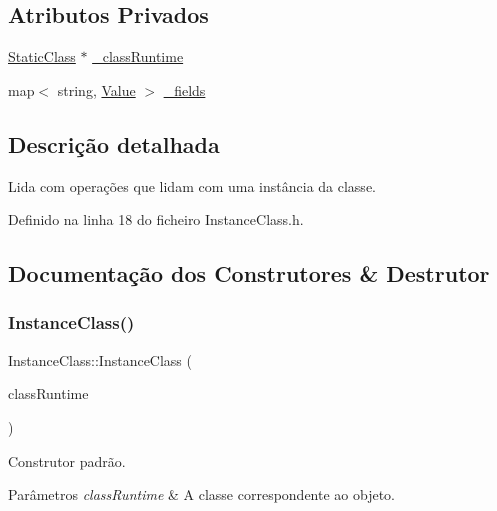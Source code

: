 \subsection*{Atributos Privados}
\begin{DoxyCompactItemize}
\item 
\hyperlink{classStaticClass}{Static\+Class} $\ast$ \hyperlink{classInstanceClass_aa8ed961b694f26f470dc2399532d3538}{\+\_\+class\+Runtime}
\item 
map$<$ string, \hyperlink{structValue}{Value} $>$ \hyperlink{classInstanceClass_a603a0866f5113d16ff8f80b5d6bf152b}{\+\_\+fields}
\end{DoxyCompactItemize}


\subsection{Descrição detalhada}
Lida com operações que lidam com uma instância da classe. 

Definido na linha 18 do ficheiro Instance\+Class.\+h.



\subsection{Documentação dos Construtores \& Destrutor}
\mbox{\label{classInstanceClass_a86ab031eb0f0240b0a54423003000322}} 
\subsubsection{\texorpdfstring{Instance\+Class()}{InstanceClass()}}
{\footnotesize\ttfamily Instance\+Class\+::\+Instance\+Class (\begin{DoxyParamCaption}\item[{\hyperlink{classStaticClass}{Static\+Class} $\ast$}]{class\+Runtime }\end{DoxyParamCaption})}



Construtor padrão. 


\begin{DoxyParams}{Parâmetros}
{\em class\+Runtime} & A classe correspondente ao objeto. \\
\hline
\end{DoxyParams}


